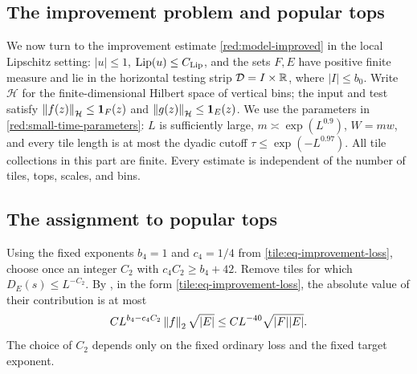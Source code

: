 \subsection{The improvement problem and popular tops}\label{forest:section}

We now turn to the improvement estimate \eqref{red:model-improved}
in the local Lipschitz setting: \(|u|\le1\),
\(\operatorname{Lip}(u)\le C_{\rm Lip}\), and the sets \(F,E\) have positive
finite measure and lie in the horizontal testing strip
\(\mathcal D=I\times\mathbb R\), where \(|I|\le b_0\).
Write \(\mathcal H\) for the finite-dimensional Hilbert space of
vertical bins; the input and test satisfy
\(\left\|f(z)\right\|_{\mathcal H}\le\mathbf 1_F(z)\) and
\(\left\|g(z)\right\|_{\mathcal H}\le\mathbf 1_E(z)\).
We use the parameters in \eqref{red:small-time-parameters}: \(L\)
is sufficiently large, \(m\asymp\exp(L^{0.9})\), \(W=mw\),
and every tile length is at most the dyadic cutoff
\(\tau\le\exp(-L^{0.97})\). All tile collections in this part
are finite. Every estimate is independent of the number of tiles,
tops, scales, and bins.

\subsection{The assignment to popular tops}

Using the fixed exponents \(b_4=1\) and \(c_4=1/4\) from
\eqref{tile:eq-improvement-loss}, choose once an integer \(C_2\)
with \(c_4C_2\ge b_4+42\). Remove tiles
for which \(D_E(s)\le L^{-C_2}\). By
, in the form
\eqref{tile:eq-improvement-loss}, the absolute
value of their contribution is at most
\[
 C L^{b_4-c_4C_2}\left\|f\right\|_2\sqrt{|E|}
 \le C L^{-40}\sqrt{|F||E|}.
\]
The choice of \(C_2\) depends only on the fixed ordinary loss and
the fixed target exponent.

